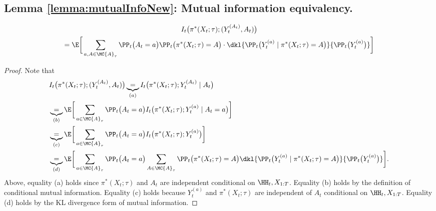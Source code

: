 \subsection{Lemma \ref{lemma:mutualInfoNew}: Mutual information equivalency.} 
\begin{lemma}
\label{lemma:mutualInfoNew}
\begin{multline*}
    I_t \big( \pi^*(X_t; \tau); ( Y_t^{(A_t)}, A_t ) \big) \\
    = \E \bigg[ \sum_{a, A \in \MC{A}_{\tau}} \PP_t \big( A_t = a \big) \PP_t \big( \pi^*(X_t ; \tau) = A \big) \cdot \dkl{ \PP_t \big( Y_t^{(a)} \mid \pi^*(X_t; \tau) = A \big) }{ \PP_t \big( Y_t^{(a)} \big) } \bigg]
\end{multline*}
\end{lemma}

\begin{proof}
Note that
\begin{align*}
    &I_t \big( \pi^*(X_t; \tau); ( Y_t^{(A_t)}, A_t ) \big)
    \underbrace{=}_{(a)} I_t \big( \pi^*(X_t; \tau); Y_t^{(A_t)} \mid A_t \big) \\
    &\underbrace{=}_{(b)} \E \bigg[ \sum_{a \in \MC{A}_{\tau}} \PP_t \big( A_t = a \big) I_t \big( \pi^*(X_t; \tau); Y_t^{(a)} \mid A_t = a \big) \bigg] \\
    &\underbrace{=}_{(c)} \E \bigg[ \sum_{a \in \MC{A}_{\tau}} \PP_t \big( A_t = a \big) I_t \big( \pi^*(X_t; \tau); Y_t^{(a)} \big) \bigg] \\
    &\underbrace{=}_{(d)} \E \bigg[ \sum_{a \in \MC{A}_{\tau}} \PP_t \big( A_t = a \big) \sum_{A \in \MC{A}_{\tau}} \PP_t \big( \pi^*(X_t; \tau) = A \big) \dkl{\PP_t \big( Y_t^{(a)} \mid \pi^*(X_t; \tau) = A \big)}{\PP_t \big( Y_t^{(a)}\big)} \bigg].
\end{align*}
Above, equality (a) holds since  $\pi^*(X_t; \tau)$ and $A_t$ are independent conditional on $\HH_{t}, X_{1:T}$. 
Equality (b) holds by the definition of conditional mutual information.
Equality (c) holds because $Y_t^{(a)}$ and $\pi^*(X_t; \tau)$ are independent of $A_t$ conditional on $\HH_{t}, X_{1:T}$.
Equality (d) holds by the KL divergence form of mutual information.
\end{proof}




